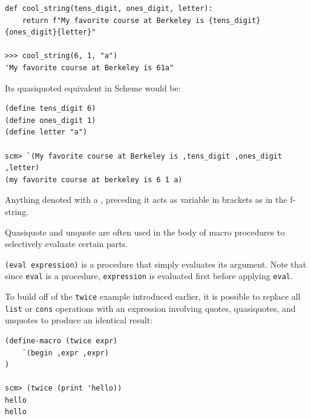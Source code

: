 \begin{lstlisting}
def cool_string(tens_digit, ones_digit, letter):
    return f"My favorite course at Berkeley is {tens_digit}{ones_digit}{letter}"

>>> cool_string(6, 1, "a")
'My favorite course at Berkeley is 61a"
\end{lstlisting}

Its quasiquoted equivalent in Scheme would be:

\begin{lstlisting}
(define tens_digit 6)
(define ones_digit 1)
(define letter "a")

scm> `(My favorite course at Berkeley is ,tens_digit ,ones_digit ,letter)
(my favorite course at berkeley is 6 1 a)
\end{lstlisting}

Anything denoted with a , preceding it acts as variable in brackets as in the f-string.


Quasiquote and unquote are often used in the body of macro procedures to selectively evaluate certain parts. 

\texttt{(eval expression)} is a procedure that simply evaluates its argument. Note that since \texttt{eval} is a procedure, \texttt{expression} is evaluated first before applying \texttt{eval}.

To build off of the \texttt{twice} example introduced earlier, it is possible to replace all \texttt{list} or \texttt{cons} operations with an expression involving quotes, quasiquotes, and unquotes to produce an identical result:

\begin{lstlisting}
(define-macro (twice expr)
    `(begin ,expr ,expr)
)

scm> (twice (print 'hello))
hello
hello
\end{lstlisting}
